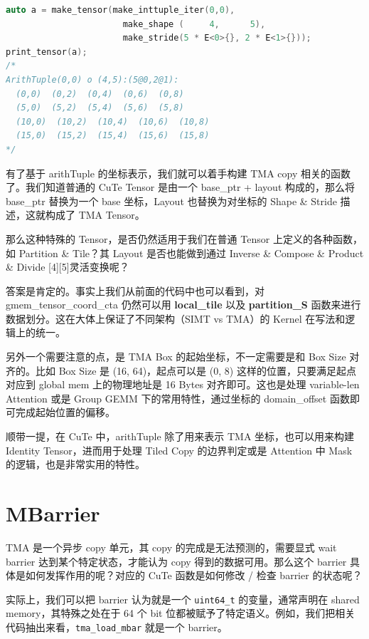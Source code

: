 \begin{lstlisting}[language=C++]
auto a = make_tensor(make_inttuple_iter(0,0),
                       make_shape (     4,      5),
                       make_stride(5 * E<0>{}, 2 * E<1>{}));
print_tensor(a);
/*
ArithTuple(0,0) o (4,5):(5@0,2@1):
  (0,0)  (0,2)  (0,4)  (0,6)  (0,8)
  (5,0)  (5,2)  (5,4)  (5,6)  (5,8)
  (10,0)  (10,2)  (10,4)  (10,6)  (10,8)
  (15,0)  (15,2)  (15,4)  (15,6)  (15,8)
*/
\end{lstlisting}

有了基于 arithTuple 的坐标表示，我们就可以着手构建 TMA copy 相关的函数了。我们知道普通的 CuTe Tensor 是由一个 base\_ptr + layout 构成的，那么将 base\_ptr 替换为一个 base 坐标，Layout 也替换为对坐标的 Shape \& Stride 描述，这就构成了 TMA Tensor。

那么这种特殊的 Tensor，是否仍然适用于我们在普通 Tensor 上定义的各种函数，如 Partition \& Tile？其 Layout 是否也能做到通过 Inverse \& Compose \& Product \& Divide [4][5]灵活变换呢？

答案是肯定的。事实上我们从前面的代码中也可以看到，对 gmem\_tensor\_coord\_cta 仍然可以用 \textbf{local\_tile} 以及 \textbf{partition\_S} 函数来进行数据划分。这在大体上保证了不同架构（SIMT vs TMA）的 Kernel 在写法和逻辑上的统一。

另外一个需要注意的点，是 TMA Box 的起始坐标，不一定需要是和 Box Size 对齐的。比如 Box Size 是 (16, 64)，起点可以是 (0, 8) 这样的位置，只要满足起点对应到 global mem 上的物理地址是 16 Bytes 对齐即可。这也是处理 variable-len Attention 或是 Group GEMM 下的常用特性，通过坐标的 domain\_offset 函数即可完成起始位置的偏移。

顺带一提，在 CuTe 中，arithTuple 除了用来表示 TMA 坐标，也可以用来构建 Identity Tensor，进而用于处理 Tiled Copy 的边界判定或是 Attention 中 Mask 的逻辑，也是非常实用的特性。

\section{MBarrier}

TMA 是一个异步 copy 单元，其 copy 的完成是无法预测的，需要显式 wait barrier 达到某个特定状态，才能认为 copy 得到的数据可用。那么这个 barrier 具体是如何发挥作用的呢？对应的 CuTe 函数是如何修改 / 检查 barrier 的状态呢？

实际上，我们可以把 barrier 认为就是一个 \verb|uint64_t| 的变量，通常声明在 shared memory，其特殊之处在于 64 个 bit 位都被赋予了特定语义。例如，我们把相关代码抽出来看，\verb|tma_load_mbar| 就是一个 barrier。

